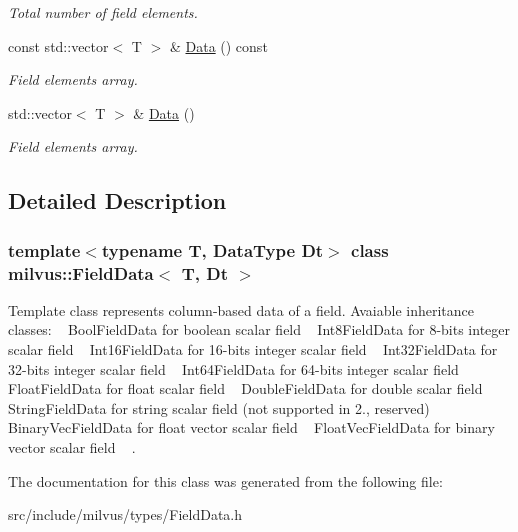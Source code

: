 \begin{DoxyCompactItemize}
\begin{DoxyCompactList}\small\item\em Total number of field elements. \end{DoxyCompactList}\item 
\mbox{\label{classmilvus_1_1_field_data_a1a9776b31838388f136926ade8aa8a7d}} 
const std\+::vector$<$ T $>$ \& \hyperlink{classmilvus_1_1_field_data_a1a9776b31838388f136926ade8aa8a7d}{Data} () const
\begin{DoxyCompactList}\small\item\em Field elements array. \end{DoxyCompactList}\item 
\mbox{\label{classmilvus_1_1_field_data_a0c0a796c4924b9ce9368add3d968661d}} 
std\+::vector$<$ T $>$ \& \hyperlink{classmilvus_1_1_field_data_a0c0a796c4924b9ce9368add3d968661d}{Data} ()
\begin{DoxyCompactList}\small\item\em Field elements array. \end{DoxyCompactList}\end{DoxyCompactItemize}


\subsection{Detailed Description}
\subsubsection*{template$<$typename T, Data\+Type Dt$>$\newline
class milvus\+::\+Field\+Data$<$ T, Dt $>$}

Template class represents column-\/based data of a field. Avaiable inheritance classes\+: ~\newline
 Bool\+Field\+Data for boolean scalar field ~\newline
 Int8\+Field\+Data for 8-\/bits integer scalar field ~\newline
 Int16\+Field\+Data for 16-\/bits integer scalar field ~\newline
 Int32\+Field\+Data for 32-\/bits integer scalar field ~\newline
 Int64\+Field\+Data for 64-\/bits integer scalar field ~\newline
 Float\+Field\+Data for float scalar field ~\newline
 Double\+Field\+Data for double scalar field ~\newline
 String\+Field\+Data for string scalar field (not supported in 2., reserved) ~\newline
 Binary\+Vec\+Field\+Data for float vector scalar field ~\newline
 Float\+Vec\+Field\+Data for binary vector scalar field ~\newline
. 

The documentation for this class was generated from the following file\+:\begin{DoxyCompactItemize}
\item 
src/include/milvus/types/Field\+Data.\+h\end{DoxyCompactItemize}
